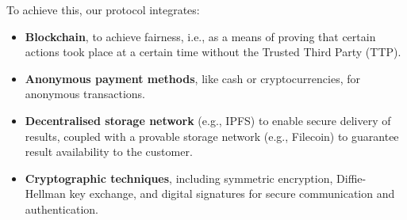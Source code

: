 \documentclass[pdftex,twocolumn,epjc3]{svjour3}
\begin{document}
\begin{sloppypar}

To achieve this, our protocol integrates:
\begin{itemize}
  \item \textbf{Blockchain}, to achieve fairness, i.e., as a means of proving that certain actions took place at a certain time without the Trusted Third Party (TTP).
  \item \textbf{Anonymous payment methods}, like cash or cryptocurrencies, for anonymous transactions.
  \item \textbf{Decentralised storage network} (e.g., IPFS) to enable secure delivery of results, coupled with a provable storage network (e.g., Filecoin) to guarantee result availability to the customer.
  \item \textbf{Cryptographic techniques}, including symmetric encryption, Diffie-Hellman key exchange, and digital signatures for secure communication and authentication.
\end{itemize}
\end{sloppypar}
\end{document}
